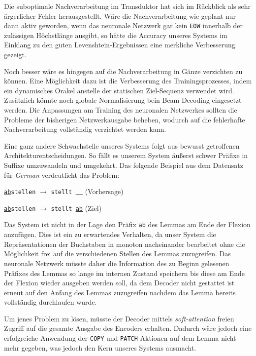\documentclass[a4paper]{article}
\newcommand{\lang}[1]{\textit{#1}}
\newcommand{\action}[1]{\texttt{#1}}
\begin{document}
Die suboptimale Nachverarbeitung im Transduktor hat sich im Rückblick als sehr ärgerlicher Fehler herausgestellt.
Wäre die Nachverarbeitung wie geplant nur dann aktiv geworden, wenn das neuronale Netzwerk gar kein \action{EOW} innerhalb der zulässigen Höchstlänge ausgibt, so hätte die Accuracy unseres Systems im Einklang zu den guten Levenshtein-Ergebnissen eine merkliche Verbesserung gezeigt.

Noch besser wäre es hingegen auf die Nachverarbeitung in Gänze verzichten zu können. Eine Möglichkeit dazu ist die Verbesserung des Trainingsprozesses, indem ein dynamisches Orakel anstelle der statischen Ziel-Sequenz verwendet wird.
Zusätzlich könnte noch globale Normalisierung bein Beam-Decoding eingesetzt werden.
Die Anpassungen am Training des neuronalen Netzwerkes sollten die Probleme der bisherigen Netzwerkausgabe beheben, wodurch auf die fehlerhafte Nachverarbeitung vollständig verzichtet werden kann. 

Eine ganz andere Schwachstelle unseres Systems folgt aus bewusst getroffenen Architekturentscheidungen.
So fällt es unserem System äußerst schwer Präfixe in Suffixe umzuwandeln und umgekehrt. Das folgende Beispiel aus dem Datensatz für \lang{German} verdeutlicht das Problem:
\begin{compactitem}
	\item \texttt{\underline{ab}stellen} $\to$ \texttt{stellt \underline{\ \ }} (Vorhersage)
    \item \texttt{\underline{ab}stellen} $\to$ \texttt{stellt \underline{ab}} (Ziel)
\end{compactitem}
Das System ist nicht in der Lage den Präfix \texttt{ab} des Lemmas am Ende der Flexion anzufügen.
Dies ist ein zu erwartendes Verhalten, da unser System die Repräsentationen der Buchstaben in monoton nacheinander bearbeitet ohne die Möglichkeit frei auf die verschiedenen Stellen des Lemmas zuzugreifen.
Das neuronale Netzwerk müsste daher die Information des zu Beginn gelesenen Präfixes des Lemmas so lange im internen Zustand speichern bis diese am Ende der Flexion wieder ausgeben werden soll, da dem Decoder nicht gestattet ist erneut auf den Anfang des Lemmas zuzugreifen nachdem das Lemma bereits vollständig durchlaufen wurde.

Um jenes Problem zu lösen, müsste der Decoder mittels \textit{soft-attention} freien Zugriff auf die gesamte Ausgabe des Encoders erhalten. Dadurch wäre jedoch eine erfolgreiche Anwendung der \action{COPY} und \action{PATCH} Aktionen auf dem Lemma nicht mehr gegeben, was jedoch den Kern unseres Systems ausmacht.
\end{document}
